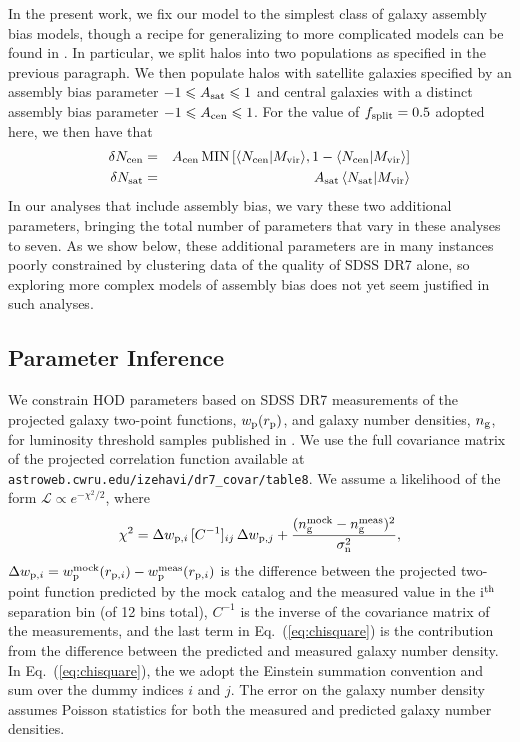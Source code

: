 \documentclass[usenatbib,usegraphicx,letterpaper]{mn2e}
\newcommand{\mvir}{M_{\rm vir}}
\begin{document}
In the present work, we fix our model to the simplest class of galaxy
assembly bias models, though a recipe for generalizing to more
complicated models can be found in \citet{hearin_etal16}. In
particular, we split halos into two populations as specified in the
previous paragraph. We then populate halos with satellite galaxies
specified by an assembly bias parameter $-1 \le A_{\rm sat} \le 1$ and
central galaxies with a distinct assembly bias parameter
$-1 \le A_{\rm cen} \le 1$. For the value of $f_{\rm split}=0.5$ adopted here,
we then have that
%
\begin{eqnarray}
%
\delta N_{\rm cen} & = & A_{\rm cen} \, {\rm MIN} \left[ \langle N_{\mathrm{cen}} \vert \mvir \rangle ,
1- \langle N_{\mathrm{cen}} \vert \mvir \rangle \right]  \nonumber \\ 
\delta N_{\rm sat} & = & A_{\rm sat} \, \langle N_{\mathrm{sat}} \vert \mvir \rangle
\end{eqnarray}
%
In our analyses that include assembly bias, we vary these two
additional parameters, bringing the total number of parameters
that vary in these analyses to seven. As we show below, these additional
parameters are in many instances poorly constrained by clustering data
of the quality of SDSS DR7 alone, so exploring more complex models of
assembly bias does not yet seem justified in such analyses.


\subsection{Parameter Inference}
\label{subsection:mcmc}

We constrain HOD parameters based on SDSS DR7 measurements of the projected
galaxy two-point functions, $w_{\rm p}(r_{\rm p})$, and galaxy number densities, $n_{\rm g}$,
for luminosity threshold samples published in \citet{zehavi_etal11}. We use the full covariance
matrix of the projected correlation function available at
{\tt astroweb.cwru.edu/izehavi/dr7\_covar/table8}. We assume a likelihood of the
form $\mathcal{L} \propto e^{-\chi^2/2}$, where
%
\begin{equation}
\label{eq:chisquare}
\chi^2 = \Delta w_{{\rm p},i} \, [C^{-1}]_{ij} \, \Delta w_{{\rm p},j} + \frac{(n_{\rm g}^{\rm mock} - n_{\rm g}^{\rm meas})^2}{\sigma_{\rm n}^2},
\end{equation}
%
$\Delta w_{{\rm p},i} = w_{\rm p}^{\rm mock}(r_{{\rm p},i}) - w_{\rm p}^{\rm meas}(r_{{\rm p},i})$ is the difference
between the projected two-point function predicted by the mock catalog and the measured value in the i$^{\rm th}$
separation bin (of 12 bins total), $C^{-1}$ is the inverse of the covariance matrix of the measurements,
and the last term in Eq.~(\ref{eq:chisquare}) is the contribution from the difference between the predicted and measured
galaxy number density. In Eq.~(\ref{eq:chisquare}), the we adopt the Einstein summation convention and sum over the 
dummy indices $i$ and $j$. The error on the galaxy number density assumes Poisson statistics for both the measured and predicted galaxy number densities.
\end{document}
